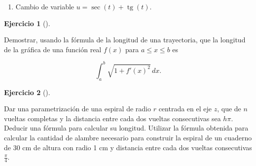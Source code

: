 \documentclass[
  a4paper,
]{scrreport}
\providecommand{\tightlist}{%
  \setlength{\itemsep}{0pt}\setlength{\parskip}{0pt}}\usepackage{longtable,booktabs,array}
\theoremstyle{definition}
\newtheorem{exercise}{Ejercicio}[chapter]
\theoremstyle{remark}
\begin{document}
\begin{tcolorbox}
\begin{enumerate}
  \begin{enumerate}
  \def\labelenumii{(\arabic{enumii})}
  \tightlist
  \item
    Cambio de variable \(u=\sec(t)+\operatorname{tg}(t)\).
  \end{enumerate}
\end{enumerate}

\end{tcolorbox}

\begin{exercise}[]\protect\hypertarget{exr-longitud-grafica-funcion}{}\label{exr-longitud-grafica-funcion}

Demostrar, usando la fórmula de la longitud de una trayectoria, que la
longitud de la gráfica de una función real \(f(x)\) para
\(a\leq x\leq b\) es

\[
\int_a^b \sqrt{1+f'(x)^2}\, dx.
\]

\end{exercise}

\begin{exercise}[]\protect\hypertarget{exr-longitud-espiral}{}\label{exr-longitud-espiral}

Dar una parametrización de una espiral de radio \(r\) centrada en el eje
\(z\), que de \(n\) vueltas completas y la distancia entre cada dos
vueltas consecutivas sea \(h\pi\). Deducir una fórmula para calcular su
longitud. Utilizar la fórmula obtenida para calcular la cantidad de
alambre necesario para construir la espiral de un cuaderno de 30 cm de
altura con radio 1 cm y distancia entre cada dos vueltas consecutivas
\(\frac{\pi}{4}\).

\end{exercise}
\end{document}
